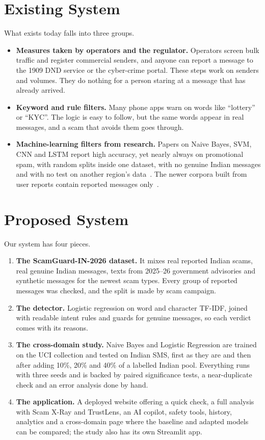 \section{Existing System}
What exists today falls into three groups.
\begin{itemize}
\item \textbf{Measures taken by operators and the regulator.} Operators screen bulk traffic and register commercial senders, and anyone can report a message to the 1909 DND service or the cyber-crime portal. These steps work on senders and volumes. They do nothing for a person staring at a message that has already arrived.
\item \textbf{Keyword and rule filters.} Many phone apps warn on words like ``lottery'' or ``KYC''. The logic is easy to follow, but the same words appear in real messages, and a scam that avoids them goes through.
\item \textbf{Machine-learning filters from research.} Papers on Naive Bayes, SVM, CNN and LSTM report high accuracy, yet nearly always on promotional spam, with random splits inside one dataset, with no genuine Indian messages and with no test on another region's data~\cite{almeida2013towards,roy2020deep,goel2024ml}. The newer corpora built from user reports contain reported messages only~\cite{timko2024smishing,agarwal2025fishing}.
\end{itemize}

\section{Proposed System}
Our system has four pieces.
\begin{enumerate}
\item \textbf{The ScamGuard-IN-2026 dataset.} It mixes real reported Indian scams, real genuine Indian messages, texts from 2025--26 government advisories and synthetic messages for the newest scam types. Every group of reported messages was checked, and the split is made by scam campaign.
\item \textbf{The detector.} Logistic regression on word and character TF-IDF, joined with readable intent rules and guards for genuine messages, so each verdict comes with its reasons.
\item \textbf{The cross-domain study.} Naive Bayes and Logistic Regression are trained on the UCI collection and tested on Indian SMS, first as they are and then after adding 10\%, 20\% and 40\% of a labelled Indian pool. Everything runs with three seeds and is backed by paired significance tests, a near-duplicate check and an error analysis done by hand.
\item \textbf{The application.} A deployed website offering a quick check, a full analysis with Scam X-Ray and TrustLens, an AI copilot, safety tools, history, analytics and a cross-domain page where the baseline and adapted models can be compared; the study also has its own Streamlit app.
\end{enumerate}

